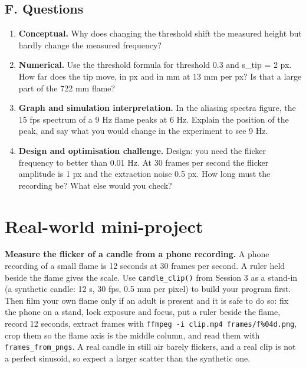 \documentclass[11pt,a4paper]{article}
\begin{document}
\subsection*{F. Questions}
\begin{enumerate}[nosep]
\item \textbf{Conceptual.} Why does changing the threshold shift the measured height but hardly change the measured frequency?
\item \textbf{Numerical.} Use the threshold formula for threshold 0.3 and s\_tip = 2 px. How far does the tip move, in px and in mm at 13 mm per px? Is that a large part of the 722 mm flame?
\item \textbf{Graph and simulation interpretation.} In the aliasing spectra figure, the 15 fps spectrum of a 9 Hz flame peaks at 6 Hz. Explain the position of the peak, and say what you would change in the experiment to see 9 Hz.
\item \textbf{Design and optimisation challenge.} Design: you need the flicker frequency to better than 0.01 Hz. At 30 frames per second the flicker amplitude is 1 px and the extraction noise 0.5 px. How long must the recording be? What else would you check?
\end{enumerate}

\section{Real-world mini-project}
\textbf{Measure the flicker of a candle from a phone recording.} A phone recording of a small flame is 12 seconds at 30 frames per second. A ruler held beside the flame gives the scale. Use \texttt{candle\_clip()} from Session 3 as a stand-in (a synthetic candle: 12 s, 30 fps, 0.5 mm per pixel) to build your program first. Then film your own flame only if an adult is present and it is safe to do so: fix the phone on a stand, lock exposure and focus, put a ruler beside the flame, record 12 seconds, extract frames with \texttt{ffmpeg -i clip.mp4 frames/f\%04d.png}, crop them so the flame axis is the middle column, and read them with \texttt{frames\_from\_pngs}. A real candle in still air barely flickers, and a real clip is not a perfect sinusoid, so expect a larger scatter than the synthetic one.
\end{document}
